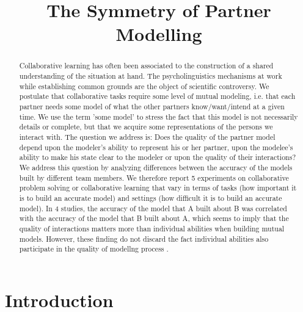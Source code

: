\documentclass[natbib]{svjour3}
\title{The Symmetry of Partner Modelling}
\author{}
\begin{document}
\maketitle

\begin{abstract}

Collaborative learning has often been associated to the construction of  a
shared   understanding of the situation at hand. The psycholinguistics
mechanisms at work while establishing common grounds are the object of
scientific controversy. We postulate that collaborative tasks require some
level of mutual modeling, i.e. that each partner needs some model of what
the other partners know/want/intend at a given time.  We use the term 'some
model' to stress the fact that this model is not necessarily details or
complete, but that we acquire some representations of the persons we
interact with. The question we address is: Does the quality of the partner
model depend upon the modeler's ability to represent his or her partner,
upon the modelee's ability to make his state clear to the modeler or upon
the quality of their interactions? We address this question by analyzing
differences between the  accuracy of the models built by different team
members. We therefore report 5 experiments on collaborative problem solving
or collaborative learning that vary in terms of tasks (how important it is
to build an accurate model) and settings (how difficult it is to build an
accurate model). In 4 studies, the accuracy of the model that A built about
B was correlated with the accuracy of the model that B built about A,  which
seems to imply that the quality of interactions matters more than individual
abilities when building mutual models.  However, these finding do not
discard the fact individual abilities also  participate in the quality of
modellng process .


\end{abstract}


\section{Introduction}
\end{document}
